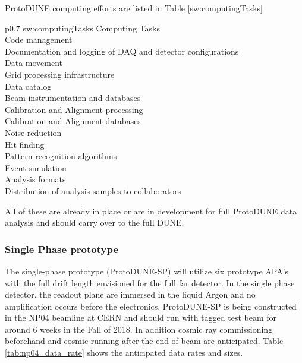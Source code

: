 \begin{enumerate}
ProtoDUNE computing efforts are listed in Table \ref{sw:computingTasks}
\begin{dunetable}
{p{0.7\textwidth}}
{sw:computingTasks}
{Computing Tasks}
\\ Code management
\\ Documentation and logging of DAQ and detector configurations
\\ Data movement 
\\ Grid processing infrastructure
\\ Data catalog
\\ Beam instrumentation and databases
\\ Calibration and Alignment processing
\\ Calibration and Alignment databases
\\ Noise reduction
\\ Hit finding
\\ Pattern recognition algorithms
\\ Event simulation
\\ Analysis formats
\\ Distribution of analysis samples to collaborators
\end{dunetable}

All of these  are already in place or are in development for full ProtoDUNE data analysis and should carry over to the full DUNE.




\subsubsection{Single Phase prototype}

The single-phase prototype (ProtoDUNE-SP) will utilize six prototype APA's with the full drift length envisioned for the full far detector. In the single phase detector, the readout plane are immersed in the liquid Argon and no amplification occurs before the electronics.    ProtoDUNE-SP is being constructed in the NP04 beamline at CERN and should run with tagged test beam for around 6 weeks in the Fall of 2018.  In addition cosmic ray commissioning beforehand and cosmic running after the end of beam are anticipated.  Table \ref{tab:np04_data_rate}
shows the anticipated data rates and sizes. 




\end{enumerate}
